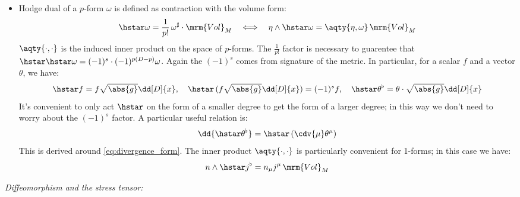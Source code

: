 \documentclass[a4paper
	,10pt
]{article}
\begin{document}
\begin{itemize}
	\item Hodge dual of a $p$-form $\omega$ is defined as contraction with the volume form:
	\begin{equation}
		\hstar\omega
		= \frac{1}{p!}\,
			\omega^\sharp \cdot \mrm{Vol}_M
	\quad\Longleftrightarrow\quad
		\eta\wedge \hstar\omega
		= \aqty{\eta,\omega} \,\mrm{Vol}_M
	\end{equation}
	$\aqty{\cdot,\cdot}$ is the induced inner product on the space of $p$-forms. 
	The $\frac{1}{p!}$ factor is necessary to guarentee that $\hstar\hstar\omega = (-1)^s\cdot(-1)^{p(D-p)} \omega$. Again the $(-1)^s$ comes from signature of the metric. In particular, for a scalar $f$ and a vector $\theta$, we have:
	\begin{equation}
		\hstar f
		= f\sqrt{\abs{g}} \dd[D]{x},
	\quad
		\hstar\,(f\sqrt{\abs{g}} \dd[D]{x})
		= (-1)^s f,
	\quad
		\hstar \theta^\flat
		= \theta\cdot \sqrt{\abs{g}} \dd[D]{x}
	\end{equation}
	It's convenient to only act $\hstar$ on the form of a smaller degree to get the form of a larger degree; in this way we don't need to worry about the $(-1)^s$ factor. 
	A particular useful relation is:
	\begin{equation}
		\dd{\hstar \theta^\flat}
		= \hstar\,(\cdv{\mu} \theta^\mu)
	\end{equation}
	This is derived around \eqref{eq:divergence_form}. The inner product $\aqty{\cdot,\cdot}$ is particularly convenient for 1-forms; in this case we have:
	\begin{equation}
		n \wedge\hstar j^\flat
		= n_\mu j^\mu \,\mrm{Vol}_M
	\end{equation}
	
	\end{itemize}
\textit{Diffeomorphism and the stress tensor:}
	
\end{document}
